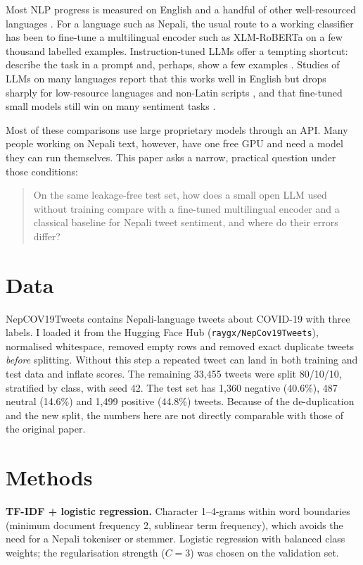 \documentclass[11pt,a4paper]{article}
\begin{document}
Most NLP progress is measured on English and a handful of other well-resourced languages \cite{joshi2020}. For a language such as Nepali, the usual route to a working classifier has been to fine-tune a multilingual encoder such as XLM-RoBERTa \cite{conneau2020} on a few thousand labelled examples. Instruction-tuned LLMs offer a tempting shortcut: describe the task in a prompt and, perhaps, show a few examples \cite{brown2020}. Studies of LLMs on many languages report that this works well in English but drops sharply for low-resource languages and non-Latin scripts \cite{ahuja2023,lai2023}, and that fine-tuned small models still win on many sentiment tasks \cite{zhang2023}.

Most of these comparisons use large proprietary models through an API. Many people working on Nepali text, however, have one free GPU and need a model they can run themselves. This paper asks a narrow, practical question under those conditions:

\begin{quote}
On the same leakage-free test set, how does a small open LLM used without training compare with a fine-tuned multilingual encoder and a classical baseline for Nepali tweet sentiment, and where do their errors differ?
\end{quote}

\section{Data}

NepCOV19Tweets \cite{sitaula2021} contains Nepali-language tweets about COVID-19 with three labels. I loaded it from the Hugging Face Hub (\texttt{raygx/NepCov19Tweets}), normalised whitespace, removed empty rows and removed exact duplicate tweets \emph{before} splitting. Without this step a repeated tweet can land in both training and test data and inflate scores. The remaining 33,455 tweets were split 80/10/10, stratified by class, with seed 42. The test set has 1,360 negative (40.6\%), 487 neutral (14.6\%) and 1,499 positive (44.8\%) tweets. Because of the de-duplication and the new split, the numbers here are not directly comparable with those of the original paper.

\section{Methods}

\textbf{TF-IDF + logistic regression.} Character 1--4-grams within word boundaries (minimum document frequency 2, sublinear term frequency), which avoids the need for a Nepali tokeniser or stemmer. Logistic regression with balanced class weights; the regularisation strength ($C=3$) was chosen on the validation set.
\end{document}
